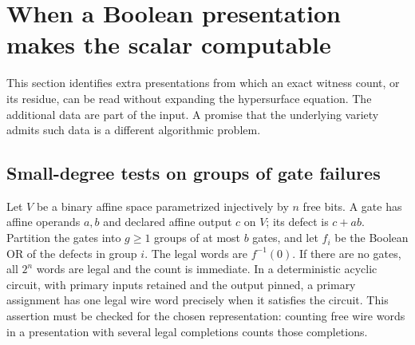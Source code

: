 \section{When a Boolean presentation makes the scalar computable}
\label{sec:structured}
This section identifies extra presentations from which an exact witness count, or its residue, can be read without expanding the hypersurface equation. The additional data are part of the input. A promise that the underlying variety admits such data is a different algorithmic problem.

\subsection{Small-degree tests on groups of gate failures}
Let $V$ be a binary affine space parametrized injectively by $n$ free bits. A gate has affine operands $a,b$ and declared affine output $c$ on $V$; its defect is $c+ab$. Partition the gates into $g\ge1$ groups of at most $b$ gates, and let $f_i$ be the Boolean OR of the defects in group $i$. The legal words are $f^{-1}(0)$. If there are no gates, all $2^n$ words are legal and the count is immediate. In a deterministic acyclic circuit, with primary inputs retained and the output pinned, a primary assignment has one legal wire word precisely when it satisfies the circuit. This assertion must be checked for the chosen representation: counting free wire words in a presentation with several legal completions counts those completions.

